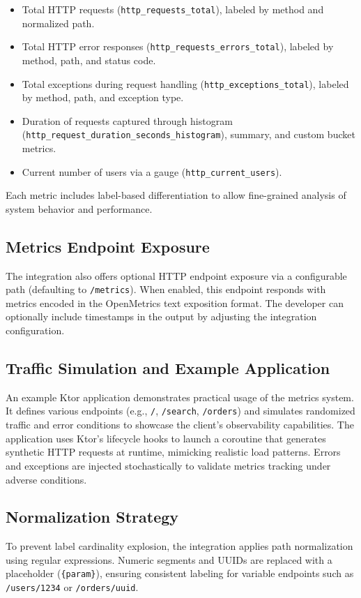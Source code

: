 \begin{itemize}
  \item Total HTTP requests (\texttt{http\_requests\_total}), labeled by method and normalized path.
  \item Total HTTP error responses (\texttt{http\_requests\_errors\_total}), labeled by method, path, and status code.
  \item Total exceptions during request handling (\texttt{http\_exceptions\_total}), labeled by method, path, and exception type.
  \item Duration of requests captured through histogram (\texttt{http\_request\_duration\_seconds\_histogram}), summary, and custom bucket metrics.
  \item Current number of users via a gauge (\texttt{http\_current\_users}).
\end{itemize}

Each metric includes label-based differentiation to allow fine-grained analysis of system behavior and performance.

\subsection*{Metrics Endpoint Exposure}
The integration also offers optional HTTP endpoint exposure via a configurable path (defaulting to \texttt{/metrics}). When enabled, this endpoint responds with metrics encoded in the OpenMetrics text exposition format. The developer can optionally include timestamps in the output by adjusting the integration configuration.

\subsection*{Traffic Simulation and Example Application}
An example Ktor application demonstrates practical usage of the metrics system. It defines various endpoints (e.g., \texttt{/}, \texttt{/search}, \texttt{/orders}) and simulates randomized traffic and error conditions to showcase the client's observability capabilities. The application uses Ktor's lifecycle hooks to launch a coroutine that generates synthetic HTTP requests at runtime, mimicking realistic load patterns. Errors and exceptions are injected stochastically to validate metrics tracking under adverse conditions.

\subsection*{Normalization Strategy}
To prevent label cardinality explosion, the integration applies path normalization using regular expressions. Numeric segments and UUIDs are replaced with a placeholder (\texttt{\{param\}}), ensuring consistent labeling for variable endpoints such as \texttt{/users/1234} or \texttt{/orders/uuid}.

